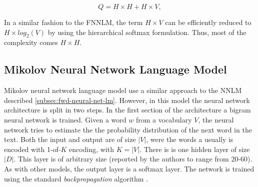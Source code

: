 \begin{equation} Q = H \times H + H \times V,   \end{equation}

In a similar fashion to the \ac{FNNLM}, the term $H \times V$ can be
efficiently reduced to $H \times log_2(V)$ by using the hierarchical softmax
formulation. Thus, most of the complexity comes $H \times H$.







\subsection{Mikolov Neural Network Language Model}
\label{sec:mikolov-neural-net-model}



Mikolov neural network language model use a similar  approach to the
\ac{NNLM} described  \ref{subsec:fwd-neural-net-lm}. However, in this model  the neural
network architecture is split in two steps. In the first section of  the
architecture  a bigram neural network is trained. Given a word $w$ from a vocabulary $V$, the neural
network tries to estimate the the probability distribution of the next word
in the text. Both the input and output are of size $|V|$, were the words a
usually is encoded with 1-of-$K$ encoding, with $K=|V|$.  There is is one hidden layer of
size $|D|$. This layer is of  arbitrary size (reported by the authors  to
range from 20-60). As with other models, the output layer  is a  softmax
layer. The network is trained  using the standard \textit{backpropagation}
algorithm \cite{conf/icassp/MikolovKBGC09}. 

